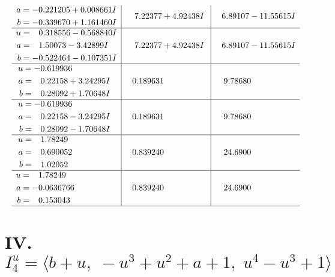 \documentclass[1p]{elsarticle_modified}
\theoremstyle{definition}
\begin{document}
$$\begin{array}{c|c|c}
\begin{aligned}
a &= -0.221205 + 0.008661 I \\
b &= -0.339670 + 1.161460 I\end{aligned}
 & \phantom{-}7.22377 + 4.92438 I & \phantom{-}6.89107 - 11.55615 I \\ \hline\begin{aligned}
u &= \phantom{-}0.318556 - 0.568840 I \\
a &= \phantom{-}1.50073 - 3.42899 I \\
b &= -0.522464 - 0.107351 I\end{aligned}
 & \phantom{-}7.22377 + 4.92438 I & \phantom{-}6.89107 - 11.55615 I \\ \hline\begin{aligned}
u &= -0.619936\phantom{ +0.000000I} \\
a &= \phantom{-}0.22158 + 3.24295 I \\
b &= \phantom{-}0.28092 + 1.70648 I\end{aligned}
 & \phantom{-}0.189631\phantom{ +0.000000I} & \phantom{-}9.78680\phantom{ +0.000000I} \\ \hline\begin{aligned}
u &= -0.619936\phantom{ +0.000000I} \\
a &= \phantom{-}0.22158 - 3.24295 I \\
b &= \phantom{-}0.28092 - 1.70648 I\end{aligned}
 & \phantom{-}0.189631\phantom{ +0.000000I} & \phantom{-}9.78680\phantom{ +0.000000I} \\ \hline\begin{aligned}
u &= \phantom{-}1.78249\phantom{ +0.000000I} \\
a &= \phantom{-}0.690052\phantom{ +0.000000I} \\
b &= \phantom{-}1.02052\phantom{ +0.000000I}\end{aligned}
 & \phantom{-}0.839240\phantom{ +0.000000I} & \phantom{-}24.6900\phantom{ +0.000000I} \\ \hline\begin{aligned}
u &= \phantom{-}1.78249\phantom{ +0.000000I} \\
a &= -0.0636766\phantom{ +0.000000I} \\
b &= \phantom{-}0.153043\phantom{ +0.000000I}\end{aligned}
 & \phantom{-}0.839240\phantom{ +0.000000I} & \phantom{-}24.6900\phantom{ +0.000000I}\\
 \hline 
 \end{array}$$\newpage\newpage\renewcommand{\arraystretch}{1}
\centering \section*{IV. $I^u_{4}= \langle b+u,\;- u^3+u^2+a+1,\;u^4- u^3+1 \rangle$}
\end{document}
